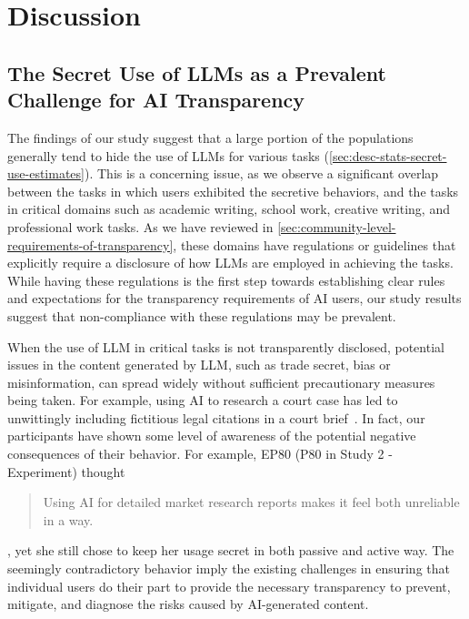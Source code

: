 \section{Discussion}

\subsection{The Secret Use of LLMs as a Prevalent Challenge for AI Transparency}

The findings of our study suggest that a large portion of the populations generally tend to hide the use of LLMs for various tasks (\autoref{sec:desc-stats-secret-use-estimates}).
This is a concerning issue, as we observe a significant overlap between the tasks in which users exhibited the secretive behaviors, and the tasks in critical domains such as academic writing, school work, creative writing, and professional work tasks.
As we have reviewed in \autoref{sec:community-level-requirements-of-transparency}, these domains have regulations or guidelines that explicitly require a disclosure of how LLMs are employed in achieving the tasks.
While having these regulations is the first step towards establishing clear rules and expectations for the transparency requirements of AI users, our study results suggest that non-compliance with these regulations may be prevalent.


When the use of LLM in critical tasks is not transparently disclosed, potential issues in the content generated by LLM, such as trade secret, bias or misinformation, can spread widely without sufficient precautionary measures being taken.
For example, using AI to research a court case has led to unwittingly including fictitious legal citations in a court brief~\cite{merken2023new}. 
In fact, our participants have shown some level of awareness of the potential negative consequences of their behavior. 
For example, EP80 (P80 in Study 2 - Experiment) thought~\blockquote{Using AI for detailed market research reports makes it feel both unreliable in a way.}, yet she still chose to keep her usage secret in both passive and active way. 
The seemingly contradictory behavior imply the existing challenges in ensuring that individual users do their part to provide the necessary transparency to prevent, mitigate, and diagnose the risks caused by AI-generated content.


